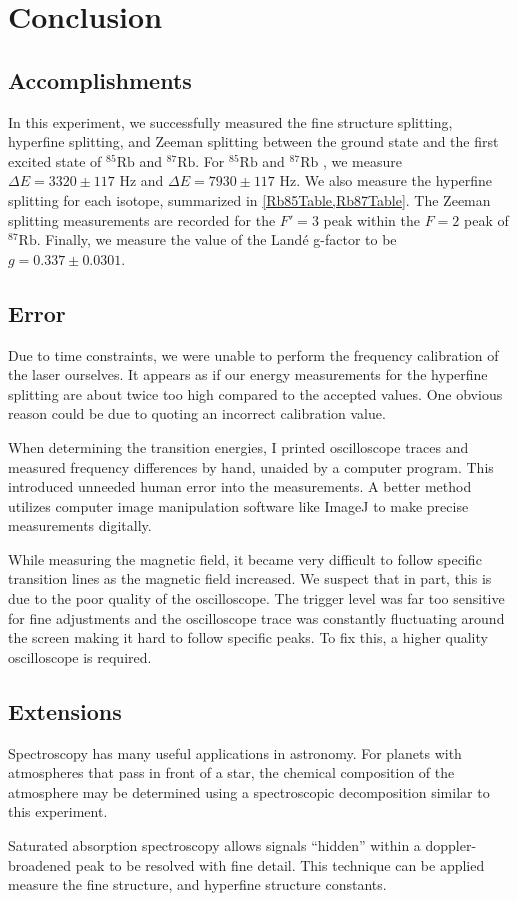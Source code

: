 \documentclass[12pt]{article}
\newcommand{\RbEF}{$^{85}\text{Rb}$ }
\newcommand{\RbES}{$^{87}\text{Rb}$ }
\begin{document}
	
	\section{Conclusion}
	
	\subsection{Accomplishments}
	In this experiment, we successfully measured the fine structure splitting, hyperfine splitting, and Zeeman splitting between the ground state and the first excited state of \RbEF and $^{87}\text{Rb}$. For \RbEF and \RbES, we measure $\Delta E = 3320 \pm 117$ Hz and $\Delta E = 7930 \pm 117$ Hz. We also measure the hyperfine splitting for each isotope, summarized in \cref{Rb85Table,Rb87Table}. The Zeeman splitting measurements are recorded for the $F'=3$ peak within the $F=2$ peak of $^{87}\text{Rb}$. Finally, we measure the value of the Land\'e g-factor to be $g=0.337 \pm 0.0301$.
	
	\subsection{Error}

	Due to time constraints, we were unable to perform the frequency calibration of the laser ourselves. It appears as if our energy measurements for the hyperfine splitting are about twice too high compared to the accepted values. One obvious reason could be due to quoting an incorrect calibration value. 
	
	When determining the transition energies, I printed oscilloscope traces and measured frequency differences by hand, unaided by a computer program. This introduced unneeded human error into the measurements. A better method utilizes computer image manipulation software like ImageJ to make precise measurements digitally.
	
	While measuring the magnetic field, it became very difficult to follow specific transition lines as the magnetic field increased. We suspect that in part, this is due to the poor quality of the oscilloscope. The trigger level was far too sensitive for fine adjustments and the oscilloscope trace was constantly fluctuating around the screen making it hard to follow specific peaks. To fix this, a higher quality oscilloscope is required.
	
	\subsection{Extensions} 
	Spectroscopy has many useful applications in astronomy.	For planets with atmospheres that pass in front of a star, the chemical composition of the atmosphere may be determined using a spectroscopic decomposition similar to this experiment.
	
	Saturated absorption spectroscopy allows signals ``hidden'' within a doppler-broadened peak to be resolved with fine detail. This technique can be applied measure the fine structure, and hyperfine structure constants.
	
	\newpage
	
%	
	\newpage
	
	
	\nocite{*}
	
	
\end{document}
